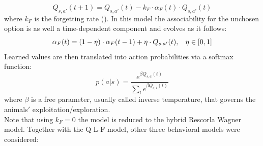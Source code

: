 \begin{equation}
    Q_{s,a'}(t+1) = Q_{s,a'}(t)-k_F\cdot\alpha_F(t)\cdot Q_{s,a'}(t)
    \label{eq:Qforgetting}
\end{equation}
where $k_F$ is the forgetting rate (\cite{ItoDoya1}). In this model the associability for the unchosen option is as well a time-dependent component and evolves as it follows:
\begin{equation}
    \alpha_F(t)=(1-\eta)\cdot\alpha_F(t-1)+\eta\cdot Q_{s,a'}(t), \hspace{0.3cm}
    \eta\in[0,1]
    \label{eq:Alphaforgetting}
\end{equation}
Learned values are then translated into action probabilities via a softmax function:
\begin{equation}
p(a|s)=\frac{e^{\beta Q_{s,a}(t)}}{\sum_l e^{\beta Q_{s,l}(t)}}
\label{eq:ProbMod}
\end{equation}
where $\beta$ is a free parameter, usually called inverse temperature, that governs the animals$'$ exploitation/exploration.\\
Note that using $k_F = 0$ the model is reduced to the hybrid Rescorla Wagner model. Together with the Q L-F model, other three behavioral models were considered:
